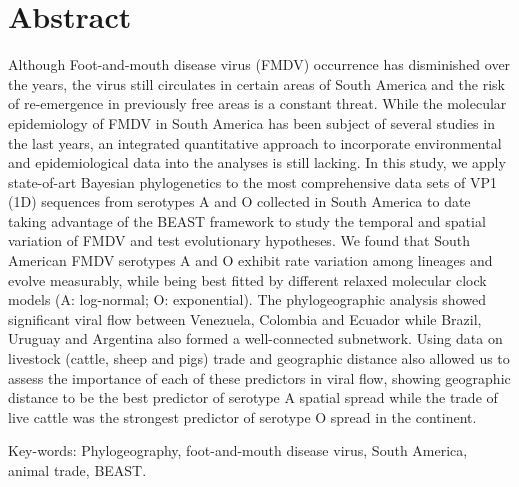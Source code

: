 \documentclass[10pt]{article}
\begin{document}
\section*{Abstract}
Although Foot-and-mouth disease virus (FMDV) occurrence has disminished over the years, the virus still circulates in certain areas of South America and the risk of re-emergence in previously free areas is a constant threat.
While the molecular epidemiology of FMDV in South America has been subject of several studies in the last years, an integrated quantitative approach to incorporate environmental and epidemiological data into the analyses is still lacking.
In this study, we apply state-of-art Bayesian phylogenetics to the most comprehensive data sets of VP1 (1D) sequences from serotypes A and O collected in South America to date taking advantage of the BEAST framework to study the temporal and spatial variation of FMDV and test evolutionary hypotheses.
We found that South American FMDV serotypes A and O exhibit rate variation among lineages and evolve measurably, while being best fitted by different relaxed molecular clock models (A: log-normal; O: exponential).
The phylogeographic analysis showed significant viral flow between Venezuela, Colombia and Ecuador while Brazil, Uruguay and Argentina also formed a well-connected subnetwork.
Using data on livestock (cattle, sheep and pigs) trade and geographic distance also allowed us to assess the importance of each of these predictors in viral flow, showing geographic distance to be the best predictor of serotype A spatial spread while the trade of live cattle was the strongest predictor of serotype O spread in the continent.

Key-words: Phylogeography, foot-and-mouth disease virus, South America, animal trade, BEAST.
\end{document}
